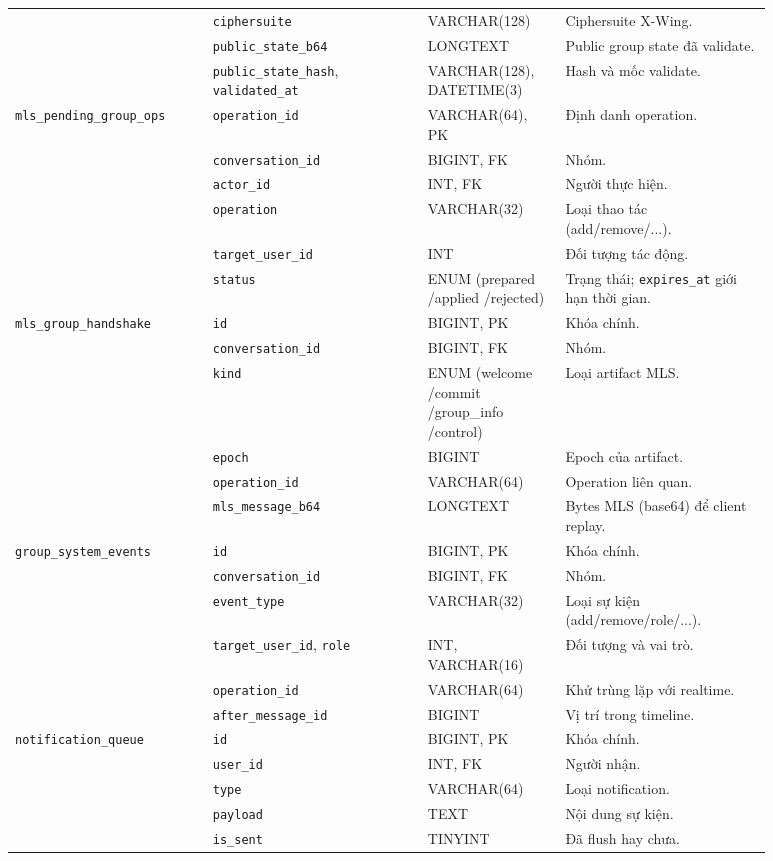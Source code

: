 {\begin{longtable}{|p{0.23\linewidth}|p{0.25\linewidth}|p{0.16\linewidth}|p{0.24\linewidth}|}
 & \texttt{ciphersuite} & VARCHAR(128) & Ciphersuite X-Wing. \\ \cline{2-4}
 & \texttt{public\_state\_b64} & LONGTEXT & Public group state đã validate. \\ \cline{2-4}
 & \texttt{public\_state\_hash}, \texttt{validated\_at} & VARCHAR(128), DATETIME(3) & Hash và mốc validate. \\ \hline
\texttt{mls\_pending\_group\_ops} & \texttt{operation\_id} & VARCHAR(64), PK & Định danh operation. \\ \cline{2-4}
 & \texttt{conversation\_id} & BIGINT, FK & Nhóm. \\ \cline{2-4}
 & \texttt{actor\_id} & INT, FK & Người thực hiện. \\ \cline{2-4}
 & \texttt{operation} & VARCHAR(32) & Loại thao tác (add/remove/...). \\ \cline{2-4}
 & \texttt{target\_user\_id} & INT & Đối tượng tác động. \\ \cline{2-4}
 & \texttt{status} & ENUM (prepared /applied /rejected) & Trạng thái; \texttt{expires\_at} giới hạn thời gian. \\ \hline
\texttt{mls\_group\_handshake} & \texttt{id} & BIGINT, PK & Khóa chính. \\ \cline{2-4}
 & \texttt{conversation\_id} & BIGINT, FK & Nhóm. \\ \cline{2-4}
 & \texttt{kind} & ENUM (welcome /commit /group\_info /control) & Loại artifact MLS. \\ \cline{2-4}
 & \texttt{epoch} & BIGINT & Epoch của artifact. \\ \cline{2-4}
 & \texttt{operation\_id} & VARCHAR(64) & Operation liên quan. \\ \cline{2-4}
 & \texttt{mls\_message\_b64} & LONGTEXT & Bytes MLS (base64) để client replay. \\ \hline
\texttt{group\_system\_events} & \texttt{id} & BIGINT, PK & Khóa chính. \\ \cline{2-4}
 & \texttt{conversation\_id} & BIGINT, FK & Nhóm. \\ \cline{2-4}
 & \texttt{event\_type} & VARCHAR(32) & Loại sự kiện (add/remove/role/...). \\ \cline{2-4}
 & \texttt{target\_user\_id}, \texttt{role} & INT, VARCHAR(16) & Đối tượng và vai trò. \\ \cline{2-4}
 & \texttt{operation\_id} & VARCHAR(64) & Khử trùng lặp với realtime. \\ \cline{2-4}
 & \texttt{after\_message\_id} & BIGINT & Vị trí trong timeline. \\ \hline
\texttt{notification\_queue} & \texttt{id} & BIGINT, PK & Khóa chính. \\ \cline{2-4}
 & \texttt{user\_id} & INT, FK & Người nhận. \\ \cline{2-4}
 & \texttt{type} & VARCHAR(64) & Loại notification. \\ \cline{2-4}
 & \texttt{payload} & TEXT & Nội dung sự kiện. \\ \cline{2-4}
 & \texttt{is\_sent} & TINYINT & Đã flush hay chưa. \\ \hline
\end{longtable}
}

